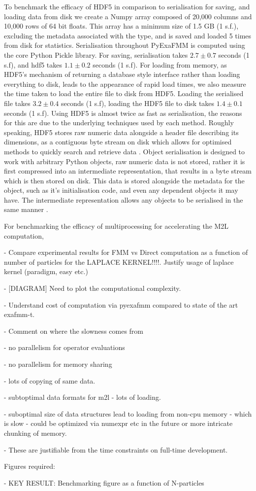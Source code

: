 To benchmark the efficacy of HDF5 in comparison to serialisation for saving,
and loading data from disk we create a Numpy array composed of
20,000 columns and 10,000 rows of 64 bit floats. This array has a minimum size
of 1.5 GB (1 s.f.), excluding the metadata associated with the type, and is
saved and loaded 5 times from disk for statistics. Serialisation throughout
\gls{PyExaFMM} is computed using the core Python Pickle library. For saving,
serialisation takes $2.7 \pm 0.7$ seconds (1 s.f), and hdf5 takes $1.1 ± 0.2$ seconds (1 s.f).
For loading from memory, as HDF5's mechanism of returning a database style interface
rather than loading everything to disk, leads to the appearance of rapid
load times, we also measure the time taken to load the entire file to disk from
HDF5. Loading the serialised file takes $3.2 \pm 0.4$ seconds (1 s.f), loading
the HDF5 file to disk takes $1.4 \pm 0.1$ seconds (1 s.f). Using HDF5 is almost
twice as fast as serialisation, the reasons for this are due to the underlying
techniques used by each method. Roughly speaking, HDF5 stores raw numeric data
alongside a header file describing its dimensions, as a contiguous byte stream
on disk which allows for optimised methods to quickly search and retrieve data
\cite{collette2013python}. Object serialisation is designed to work with arbitrary
Python objects, raw numeric data is not stored, rather it is first compressed
into an intermediate representation, that results in a byte stream which is then
stored on disk. This data is stored alongside the metadata for the object, such
as it's initialisation code, and even any dependent objects it may have. The
intermediate representation allows any objects to be serialised in the same
manner \cite{pickle}.


For benchmarking the efficacy of multiprocessing for accelerating the
\gls{M2L} computation,


- Compare experimental results for FMM vs Direct computation as a function of number of particles for the LAPLACE KERNEL!!!!. Justify usage of laplace kernel (paradigm, easy etc.)

- [DIAGRAM] Need to plot the computational complexity.

- Understand cost of computation via pyexafmm compared to state of the art exafmm-t.

- Comment on where the slowness comes from

- no parallelism for operator evaluations

- no parallelism for memory sharing

- lots of copying of same data.

- subtoptimal data formats for m2l - lots of loading.

- suboptimal size of data structures lead to loading from non-cpu memory - which is slow - could be optimized via numexpr etc in the future or more intricate chunking of memory.

- These are justifiable from the time constraints on full-time development.

Figures required:

- KEY RESULT: Benchmarking figure as a function of N-particles
